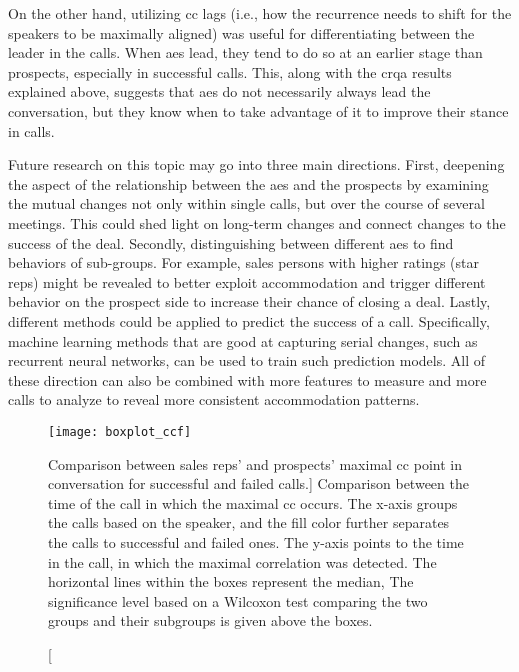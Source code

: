 On the other hand, utilizing \acl{cc} lags (i.e., how the recurrence needs to shift for the speakers to be maximally aligned) was useful for differentiating between the leader in the calls.
When \acp{ae} lead, they tend to do so at an earlier stage than prospects, especially in successful calls.
This, along with the \ac{crqa} results explained above, suggests that \acp{ae} do not necessarily always lead the conversation, but they know when to take advantage of it to improve their stance in calls.

Future research on this topic may go into three main directions.
First, deepening the aspect of the relationship between the \acp{ae} and the prospects by examining the mutual changes not only within single calls, but over the course of several meetings.
This could shed light on long-term changes and connect changes to the success of the deal.
Secondly, distinguishing between different \acp{ae} to find behaviors of sub-groups.
For example, sales persons with higher ratings (star reps) might be revealed to better exploit accommodation and trigger different behavior on the prospect side to increase their chance of closing a deal.
Lastly, different methods could be applied to predict the success of a call.
Specifically, machine learning methods that are good at capturing serial changes, such as recurrent neural networks, can be used to train such prediction models.
All of these direction can also be combined with more features to measure and more calls to analyze to reveal more consistent accommodation patterns.

\begin{figure}[t]
	\centering
	\texttt{[image: boxplot\_ccf]}
	\caption
		[Comparison between sales reps' and prospects' maximal \acl{cc} point in conversation for successful and failed calls.]
		{Comparison between the time of the call in which the maximal \acl{cc} occurs.
		The x-axis groups the calls based on the speaker, and the fill color further separates the calls to successful and failed ones.
		The y-axis points to the time in the call, in which the maximal correlation was detected.
		The horizontal lines within the boxes represent the median,
		The significance level based on a Wilcoxon test comparing the two groups and their subgroups is given above the boxes.}
	\label{fig:barplot_conv_leaders}
\end{figure}


